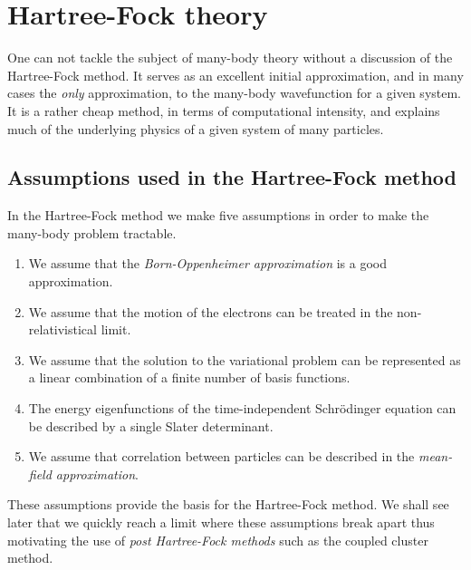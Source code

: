 \chapter{Hartree-Fock theory}
    One can not tackle the subject of many-body theory without a discussion of
    the Hartree-Fock method. It serves as an excellent initial approximation,
    and in many cases the \emph{only} approximation, to the many-body
    wavefunction for a given system. It is a rather cheap method, in terms of
    computational intensity, and explains much of the underlying physics of a
    given system of many particles.

    \section{Assumptions used in the Hartree-Fock method}
        In the Hartree-Fock method we make five assumptions in order to make the
        many-body problem tractable.
        \begin{enumerate}
            \item We assume that the \emph{Born-Oppenheimer approximation} is a
                good approximation.
            \item We assume that the motion of the electrons can be treated in
                the non-relativistical limit.
            \item We assume that the solution to the variational problem can be
                represented as a linear combination of a finite number of basis
                functions.
            \item The energy eigenfunctions of the time-independent Schrödinger
                equation can be described by a single Slater determinant.
            \item We assume that correlation between particles can be described
                in the \emph{mean-field approximation}.
        \end{enumerate}
        These assumptions provide the basis for the Hartree-Fock method. We
        shall see later that we quickly reach a limit where these assumptions
        break apart thus motivating the use of \emph{post Hartree-Fock methods}
        such as the coupled cluster method.
